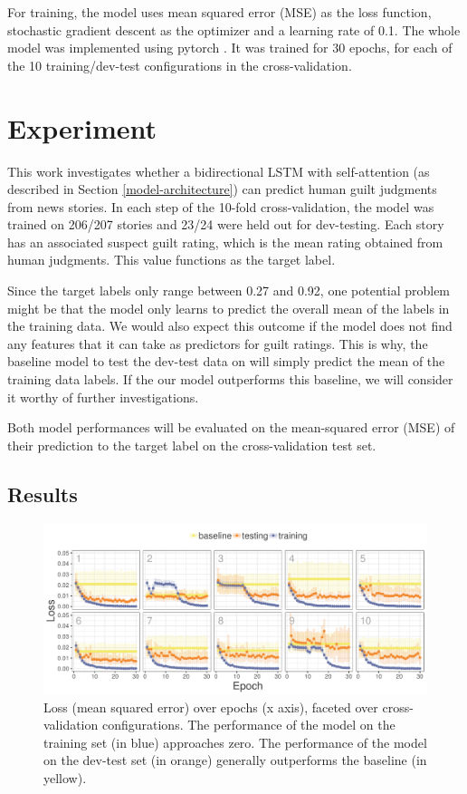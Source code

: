 \documentclass[11pt,a4paper]{article}
\begin{document}
For training, the model uses mean squared error (MSE) as the loss function, stochastic gradient descent as the optimizer and a learning rate of 0.1. The whole model was implemented using pytorch \citep{Paszke:2017}. It was trained for 30 epochs, for each of the 10 training/dev-test configurations in the cross-validation.

\section{Experiment}

This work investigates whether a bidirectional LSTM with self-attention (as described in Section \ref{model-architecture}) can predict human guilt judgments from news stories. In each step of the 10-fold cross-validation, the model was trained on 206/207 stories and 23/24 were held out for dev-testing. Each story has an associated suspect guilt rating, which is the mean rating obtained from human judgments. This value functions as the target label.

Since the target labels only range between 0.27 and 0.92, one potential problem might be that the model only learns to predict the overall mean of the labels in the training data. We would also expect this outcome if the model does not find any features that it can take as predictors for guilt ratings. This is why, the baseline model to test the dev-test data on will simply predict the mean of the training data labels. If the our model outperforms this baseline, we will consider it worthy of further investigations.

Both model performances will be evaluated on the mean-squared error (MSE) of their prediction to the target label on the cross-validation test set.

\subsection{Results}

\begin{figure}
	\includegraphics[width=\linewidth]{graphs/lossPlotCropped.pdf}
	\caption{Loss (mean squared error) over epochs (x axis), faceted over cross-validation configurations. The performance of the model on the training set (in blue) approaches zero. The performance of the model on the dev-test set (in orange) generally outperforms the baseline (in yellow).}
	\label{fig:loss}
\end{figure}
\end{document}
